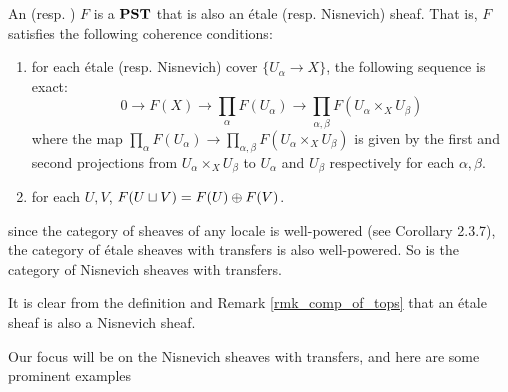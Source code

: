 \begin{defn}\label{def_etale_sheaf}\label{def_nis_sheaf}
An  (resp. ) $F$ is a $\mathbf{PST}$ that is also
an \'etale (resp. Nisnevich) sheaf. That is, $F$ satisfies the
following coherence conditions:
\begin{enumerate}
\item for each \'etale (resp. Nisnevich) cover $\{U_\alpha \to 
X\}$, the following sequence is exact:
\[
0 \to F(X) \to \prod_\alpha F(U_\alpha) \to \prod_{\alpha, \beta} 
   F(U_\alpha \times_X U_\beta)
\]
where the map $\prod_\alpha F(U_\alpha) \to \prod_{\alpha, \beta} 
F(U_\alpha \times_X U_\beta)$ is given by the first and second 
projections from $U_\alpha \times_X U_\beta$ to $U_\alpha$ and
$U_\beta$ respectively for each $\alpha, \beta$.

\item for each $U, V$, $F(U \sqcup V) = F(U) \oplus F(V)$.
\end{enumerate}
\end{defn}

since the category of sheaves of any locale is well-powered
(see \cite{Bo} Corollary 2.3.7), the category of \'etale sheaves 
with transfers is also well-powered. So is the category of 
Nisnevich sheaves with transfers.

\begin{rmk}
It is clear from the definition and Remark \ref{rmk_comp_of_tops}
that an \'etale sheaf is also a Nisnevich sheaf.
\end{rmk}

Our focus will be on the Nisnevich sheaves with transfers, and 
here are some prominent examples 


